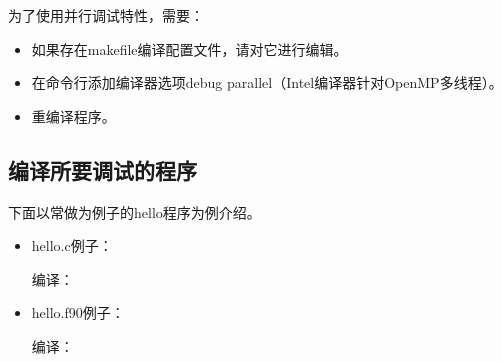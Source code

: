 \documentclass[a4paper,12pt,english]{sphinxmanual}
\begin{document}
\sphinxAtStartPar
为了使用并行调试特性，需要：
\begin{itemize}
\item {} 
\sphinxAtStartPar
如果存在makefile编译配置文件，请对它进行编辑。

\item {} 
\sphinxAtStartPar
在命令行添加编译器选项\sphinxhyphen{}debug parallel（Intel编译器针对OpenMP多线程）。

\item {} 
\sphinxAtStartPar
重编译程序。

\end{itemize}


\subsection{编译所要调试的程序}
\label{\detokenize{debug/debug:id11}}
\sphinxAtStartPar
下面以常做为例子的hello程序为例介绍。
\begin{itemize}
\item {} 
\sphinxAtStartPar
hello.c例子：

\begin{sphinxVerbatim}[commandchars=\\\{\}]
\end{sphinxVerbatim}

\sphinxAtStartPar
编译：

\sphinxAtStartPar
{}

\item {} 
\sphinxAtStartPar
hello.f90例子：

\begin{sphinxVerbatim}[commandchars=\\\{\}]
\end{sphinxVerbatim}

\sphinxAtStartPar
编译：

\sphinxAtStartPar
{}

\end{itemize}
\end{document}
